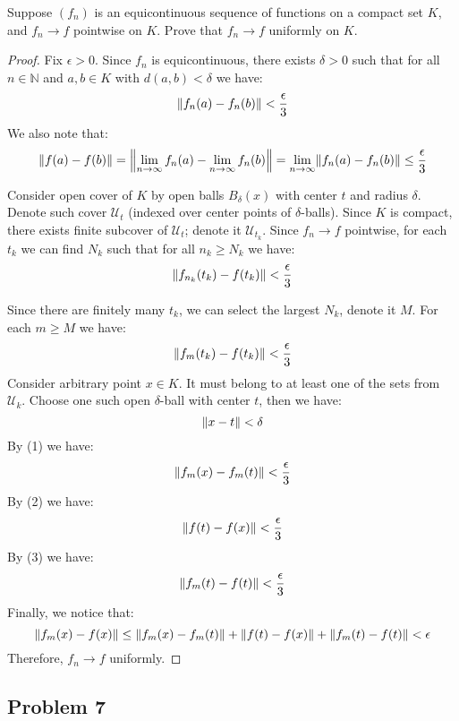 \documentclass{article}
\newcommand{\N}{\mathbb{N}}
\DeclarePairedDelimiter{\norm}{\lVert}{\rVert}
\begin{document}
\begin{tcolorbox}
Suppose $(f_n)$ is an equicontinuous sequence of functions on a compact set $K$, and $f_n \to f$ pointwise on $K$.
Prove that $f_n \to f$ uniformly on $K$.
\end{tcolorbox}

\begin{proof}

Fix $\epsilon>0$. Since $f_n$ is equicontinuous, there exists $\delta>0$ such that for all $n \in \N$ and $a, b \in K$ with $d(a,b)<\delta$ we have:
\begin{equation}
    \norm*{ f_n(a) - f_n(b) } < \frac{\epsilon}{3}
\end{equation}
We also note that:
\begin{equation}
    \norm*{ f(a) - f(b) }
    = \norm*{ \lim_{n\to\infty} f_n(a) - \lim_{n\to\infty} f_n(b) } 
    = \lim_{n\to\infty} \norm*{ f_n(a) - f_n(b) }
    \leq \frac{\epsilon}{3}
\end{equation}

Consider open cover of $K$ by open balls $B_\delta(x)$ with center $t$ and radius $\delta$. Denote such cover $\mathcal{U}_t$ (indexed over center points of $\delta$-balls).
Since $K$ is compact, there exists finite subcover of $\mathcal{U}_t$; denote it $\mathcal{U}_{t_k}$. Since $f_n \to f$ pointwise, for each $t_k$ we can find $N_k$ such that for all $n_k \geq N_k$ we have:
\[ \norm*{ f_{n_k}(t_k) - f(t_k) } < \frac{\epsilon}{3} \]

Since there are finitely many $t_k$, we can select the largest $N_k$, denote it $M$. For each $m \geq M$ we have:
\begin{equation}
    \norm*{ f_m(t_k) - f(t_k) } < \frac{\epsilon}{3}
\end{equation}
Consider arbitrary point $x \in K$.
It must belong to at least one of the sets from $\mathcal{U}_k$.
Choose one such open $\delta$-ball with center $t$, then we have:
\[ \norm*{ x - t } < \delta \]
By (1) we have:
\[ \norm*{ f_m(x) - f_m(t) } < \frac{\epsilon}{3} \]
By (2) we have:
\[ \norm*{ f(t) - f(x) } < \frac{\epsilon}{3} \]
By (3) we have:
\[ \norm*{ f_m(t) - f(t) } < \frac{\epsilon}{3} \]
Finally, we notice that:
\[
\norm*{ f_m(x) - f(x) } 
\leq
\norm*{ f_m(x) - f_m(t) } 
+ \norm*{ f(t) - f(x) } 
+ \norm*{ f_m(t) - f(t) }
<
\epsilon
\]
Therefore, $f_n \to f$ uniformly.

\end{proof}


\subsection*{Problem 7}
\end{document}
